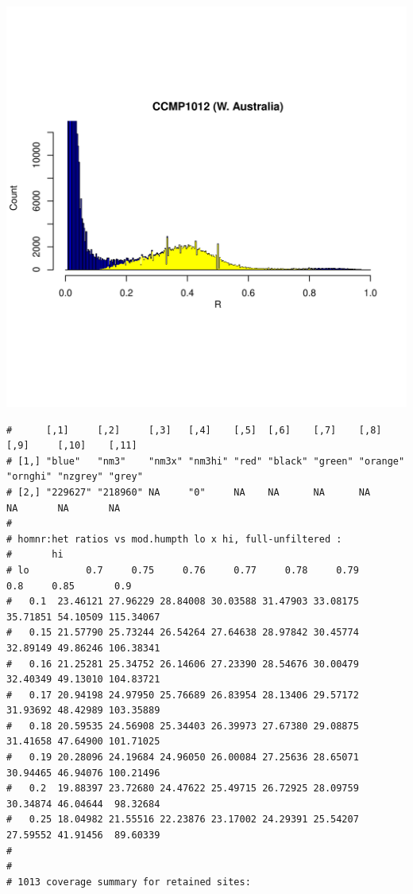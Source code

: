 \documentclass{article}\usepackage[]{graphicx}\usepackage[]{color}
\makeatletter
\def\maxwidth{ %
  \ifdim\Gin@nat@width>\linewidth
    \linewidth
  \else
    \Gin@nat@width
  \fi
}
\newenvironment{kframe}{%
 \def\at@end@of@kframe{}%
 \ifinner\ifhmode%
  \def\at@end@of@kframe{\end{minipage}}%
  \begin{minipage}{\columnwidth}%
 \fi\fi%
 \def\FrameCommand##1{\hskip\@totalleftmargin \hskip-\fboxsep
 \colorbox{shadecolor}{##1}\hskip-\fboxsep
     \hskip-\linewidth \hskip-\@totalleftmargin \hskip\columnwidth}%
 \MakeFramed {\advance\hsize-\width
   \@totalleftmargin\z@ \linewidth\hsize
   \@setminipage}}%
 {\par\unskip\endMakeFramed%
 \at@end@of@kframe}
\newenvironment{knitrout}{}{} %
\makeatother
\begin{document}
\begin{knitrout}
\includegraphics[width=\maxwidth]{FigS7-hwe-histo-figs-knitr/unnamed-chunk-10-3} 
\begin{kframe}\begin{verbatim}
#      [,1]     [,2]     [,3]   [,4]    [,5]  [,6]    [,7]    [,8]     [,9]     [,10]    [,11] 
# [1,] "blue"   "nm3"    "nm3x" "nm3hi" "red" "black" "green" "orange" "ornghi" "nzgrey" "grey"
# [2,] "229627" "218960" NA     "0"     NA    NA      NA      NA       NA       NA       NA
# 
# homnr:het ratios vs mod.humpth lo x hi, full-unfiltered :
#       hi
# lo          0.7     0.75     0.76     0.77     0.78     0.79      0.8     0.85       0.9
#   0.1  23.46121 27.96229 28.84008 30.03588 31.47903 33.08175 35.71851 54.10509 115.34067
#   0.15 21.57790 25.73244 26.54264 27.64638 28.97842 30.45774 32.89149 49.86246 106.38341
#   0.16 21.25281 25.34752 26.14606 27.23390 28.54676 30.00479 32.40349 49.13010 104.83721
#   0.17 20.94198 24.97950 25.76689 26.83954 28.13406 29.57172 31.93692 48.42989 103.35889
#   0.18 20.59535 24.56908 25.34403 26.39973 27.67380 29.08875 31.41658 47.64900 101.71025
#   0.19 20.28096 24.19684 24.96050 26.00084 27.25636 28.65071 30.94465 46.94076 100.21496
#   0.2  19.88397 23.72680 24.47622 25.49715 26.72925 28.09759 30.34874 46.04644  98.32684
#   0.25 18.04982 21.55516 22.23876 23.17002 24.29391 25.54207 27.59552 41.91456  89.60339
# 
# 
# 1013 coverage summary for retained sites:

\end{verbatim}
\end{kframe}
\end{knitrout}
\end{document}
